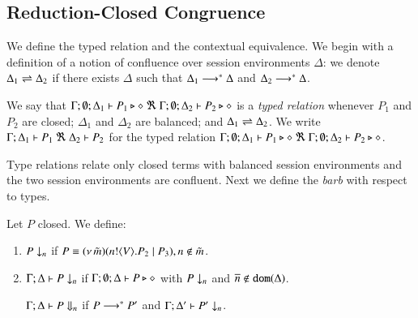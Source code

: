 \subsection{Reduction-Closed Congruence}
\label{subsec:rc}
\noi We define the typed relation and the contextual equivalence.  
We begin with a definition of a notion of confluence
over session environments $\Delta$:
we denote $\Delta_1 \rightleftharpoons \Delta_2$ if there exists $\Delta$ such that
	$\Delta_1 \longrightarrow^\ast \Delta$ and $\Delta_2 \longrightarrow^\ast \Delta$.

\smallskip 

\begin{definition}\rm %
	We say that
	$\Gamma; \emptyset; \Delta_1 \vdash P_1 \triangleright \diamond\ \Re \ \Gamma; \emptyset; \Delta_2 \vdash P_2 \triangleright \diamond$
	is a {\em typed relation} whenever $P_1$ and $P_2$ are closed;
		$\Delta_1$ and $\Delta_2$ are balanced; and 
		$\Delta_1 \rightleftharpoons \Delta_2$.
We write
$\horel{\Gamma}{\Delta_1}{P_1}{\ \Re \ }{\Delta_2}{P_2}$
for the typed relation $\Gamma; \emptyset; \Delta_1 \vdash P_1 \triangleright \diamond\ \Re \ \Gamma; \emptyset; \Delta_2 \vdash P_2 \triangleright \diamond$.
\end{definition}

\smallskip 

\noi Type relations relate only closed terms with
balanced session environments and the two session environments
are confluent.
Next we define the {\em barb} \cite{MiSa92} 
with respect to types. 

\smallskip 

\begin{definition}[Barbs]\rm
Let $P$ closed. We define:
\begin{enumerate}
		\item	$P \downarrow_{n}$ if $P \equiv (\nu\, \tilde{m})(n ! \langle V \rangle . P_2 \;|\; P_3), n \notin \tilde{m}$. %

		\item	$\Gamma; \Delta \vdash P \downarrow_{n}$ if
			$\Gamma; \emptyset; \Delta \vdash P \triangleright \diamond$ with $P \downarrow_{n}$ and $\overline{n} \notin \mathtt{dom}(\Delta)$.

	$\Gamma; \Delta \vdash P \Downarrow_{n}$ if $P \longrightarrow^* P'$ and
			$\Gamma; \Delta' \vdash P' \downarrow_{n}$.			
	\end{enumerate}
\end{definition}

